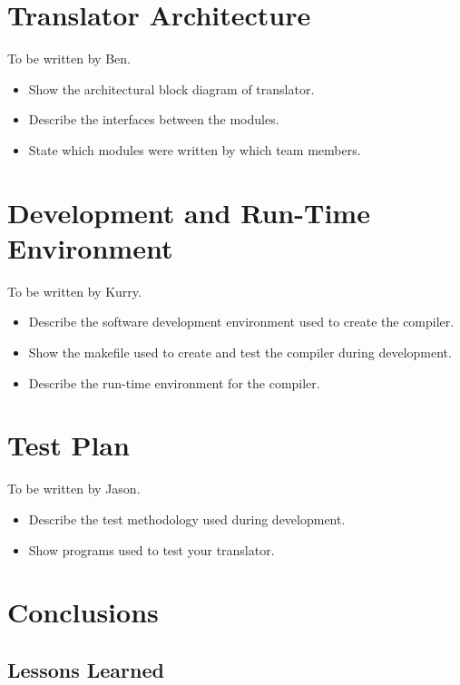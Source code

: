 \documentclass{book}
\begin{document}
\chapter{Translator Architecture}
\label{chap:trans}

To be written by Ben.

\begin{itemize}
\item Show the architectural block diagram of translator.
\item Describe the interfaces between the modules.
\item State which modules were written by which team members.
\end{itemize}

\chapter{Development and Run-Time Environment}
\label{chap:environ}

To be written by Kurry.

\begin{itemize}
\item Describe the software development environment used to create the compiler.
\item Show the makefile used to create and test the compiler during development.
\item Describe the run-time environment for the compiler.
\end{itemize}

\chapter{Test Plan}
\label{chap:test}

To be written by Jason.

\begin{itemize}
\item Describe the test methodology used during development.
\item Show programs used to test your translator.
\end{itemize}

\chapter{Conclusions}
\label{chap:concl}

\section{Lessons Learned}
\label{sec:lessons}
\end{document}
